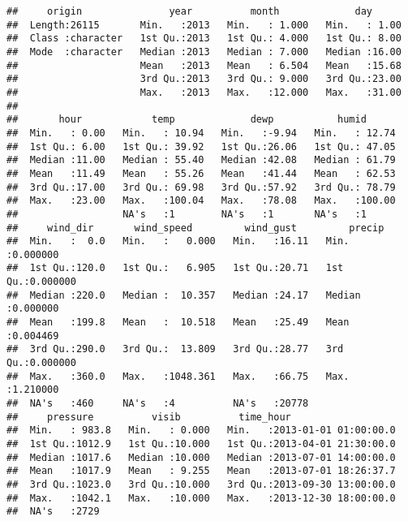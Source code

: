 \documentclass[
]{article}
\begin{document}
\begin{verbatim}
##     origin               year          month             day       
##  Length:26115       Min.   :2013   Min.   : 1.000   Min.   : 1.00  
##  Class :character   1st Qu.:2013   1st Qu.: 4.000   1st Qu.: 8.00  
##  Mode  :character   Median :2013   Median : 7.000   Median :16.00  
##                     Mean   :2013   Mean   : 6.504   Mean   :15.68  
##                     3rd Qu.:2013   3rd Qu.: 9.000   3rd Qu.:23.00  
##                     Max.   :2013   Max.   :12.000   Max.   :31.00  
##                                                                    
##       hour            temp             dewp           humid       
##  Min.   : 0.00   Min.   : 10.94   Min.   :-9.94   Min.   : 12.74  
##  1st Qu.: 6.00   1st Qu.: 39.92   1st Qu.:26.06   1st Qu.: 47.05  
##  Median :11.00   Median : 55.40   Median :42.08   Median : 61.79  
##  Mean   :11.49   Mean   : 55.26   Mean   :41.44   Mean   : 62.53  
##  3rd Qu.:17.00   3rd Qu.: 69.98   3rd Qu.:57.92   3rd Qu.: 78.79  
##  Max.   :23.00   Max.   :100.04   Max.   :78.08   Max.   :100.00  
##                  NA's   :1        NA's   :1       NA's   :1       
##     wind_dir       wind_speed         wind_gust         precip        
##  Min.   :  0.0   Min.   :   0.000   Min.   :16.11   Min.   :0.000000  
##  1st Qu.:120.0   1st Qu.:   6.905   1st Qu.:20.71   1st Qu.:0.000000  
##  Median :220.0   Median :  10.357   Median :24.17   Median :0.000000  
##  Mean   :199.8   Mean   :  10.518   Mean   :25.49   Mean   :0.004469  
##  3rd Qu.:290.0   3rd Qu.:  13.809   3rd Qu.:28.77   3rd Qu.:0.000000  
##  Max.   :360.0   Max.   :1048.361   Max.   :66.75   Max.   :1.210000  
##  NA's   :460     NA's   :4          NA's   :20778                     
##     pressure          visib          time_hour                    
##  Min.   : 983.8   Min.   : 0.000   Min.   :2013-01-01 01:00:00.0  
##  1st Qu.:1012.9   1st Qu.:10.000   1st Qu.:2013-04-01 21:30:00.0  
##  Median :1017.6   Median :10.000   Median :2013-07-01 14:00:00.0  
##  Mean   :1017.9   Mean   : 9.255   Mean   :2013-07-01 18:26:37.7  
##  3rd Qu.:1023.0   3rd Qu.:10.000   3rd Qu.:2013-09-30 13:00:00.0  
##  Max.   :1042.1   Max.   :10.000   Max.   :2013-12-30 18:00:00.0  
##  NA's   :2729
\end{verbatim}
\end{document}
